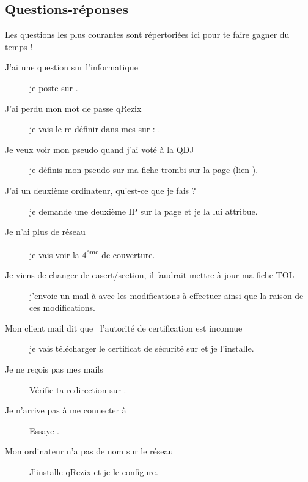 
\subsection{Questions-réponses}

Les questions les plus courantes sont répertoriées ici pour te faire gagner du temps !

\begin{description}

\item[J'ai une question sur l'informatique] je poste sur .

\item[J'ai perdu mon mot de passe qRezix] je vais le re-définir dans mes   sur \fkz : .

\item[Je veux voir mon pseudo quand j'ai voté à la QDJ] je définis mon pseudo sur ma fiche trombi sur la page  (lien ).

\item[J'ai un deuxième ordinateur, qu'est-ce que je fais ?] je demande une deuxième IP sur la page  et je la lui attribue.

\item[Je n'ai plus de réseau] je vais voir la 4\textsuperscript{ème} de couverture.

\item[Je viens de changer de casert/section, il faudrait mettre à jour ma fiche TOL] j'envoie un mail à  avec les modifications à effectuer ainsi que la raison de ces
modifications.

\item[Mon client mail dit que \guillemotleft~l'autorité de certification est inconnue~\guillemotright ] je vais télécharger le certificat de sécurité sur  et je l'installe.

\item[Je ne reçois pas mes mails] Vérifie ta redirection sur .

\item[Je n'arrive pas à me connecter à ] Essaye .

\item[Mon ordinateur n'a pas de nom sur le réseau] J'installe qRezix et je le configure.


\end{description}
